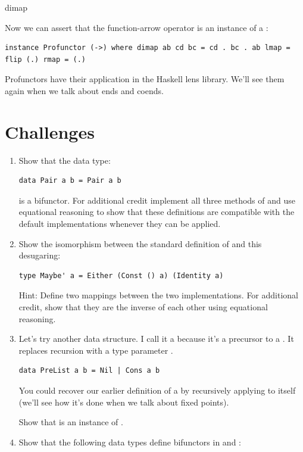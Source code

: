 dimap

Now we can assert that the function-arrow operator is an instance of a
:

\begin{verbatim}
instance Profunctor (->) where dimap ab cd bc = cd . bc . ab lmap = flip (.) rmap = (.)
\end{verbatim}

Profunctors have their application in the Haskell lens library. We'll
see them again when we talk about ends and coends.

\section{Challenges}\label{challenges}

\begin{enumerate}
\item
  Show that the data type:

\begin{verbatim}
data Pair a b = Pair a b
\end{verbatim}

  is a bifunctor. For additional credit implement all three methods of
   and use equational reasoning to show that these
  definitions are compatible with the default implementations whenever
  they can be applied.
\item
  Show the isomorphism between the standard definition of 
  and this desugaring:

\begin{verbatim}
type Maybe' a = Either (Const () a) (Identity a)
\end{verbatim}

  Hint: Define two mappings between the two implementations. For
  additional credit, show that they are the inverse of each other using
  equational reasoning.
\item
  Let's try another data structure. I call it a  because
  it's a precursor to a . It replaces recursion with a type
  parameter .

\begin{verbatim}
data PreList a b = Nil | Cons a b
\end{verbatim}

  You could recover our earlier definition of a  by
  recursively applying  to itself (we'll see how it's
  done when we talk about fixed points).

  Show that  is an instance of .
\item
  Show that the following data types define bifunctors in  and
  :


\end{enumerate}
